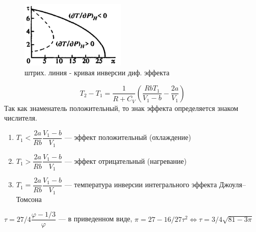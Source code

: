 \begin{figure}
	\includegraphics[width=50mm]{ris22_3.png}
	\caption{штрих. линия - кривая инверсии диф. эффекта}
\end{figure}
$$T_2-T_1=\dfrac{1}{R+\overline{C_V}}\left(\dfrac{RbT_1}{V_1-b}-\dfrac{2a}{V_1}\right)$$
Так как знаменатель положительный, то знак эффекта определяется знаком числителя.
\begin{enumerate}
	\item $T_1<\dfrac{2a}{Rb}\dfrac{V_1-b}{V_1}$ --- эффект положительный (охлаждение)
	\item $T_1>\dfrac{2a}{Rb}\dfrac{V_1-b}{V_1}$ --- эффект отрицательный (нагревание)
	\item $T_1=\dfrac{2a}{Rb}\dfrac{V_1-b}{V_1}$ --- температура инверсии интегрального эффекта Джоуля--Томсона
\end{enumerate}
$\tau=27/4\dfrac{\varphi-1/3}{\varphi}$ --- в приведенном виде, $\pi=27-16/27\tau^2\Leftrightarrow\tau=3/4\sqrt{81-3\pi}$

